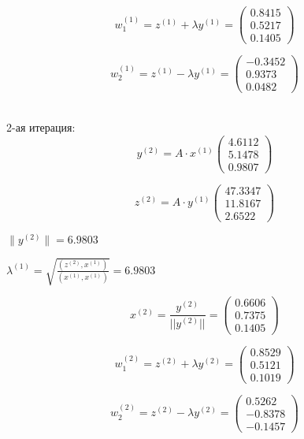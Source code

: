 \documentclass{article}
\begin{document}
	\[w^{(1)}_1 =z^{(1)} +  \lambda y^{(1)}=							
	\left(
	\begin{array}{ccc}
		0.8415 \\
		0.5217 \\
		0.1405
	\end{array}
	\right) \]
	
	\[w^{(1)}_2 =z^{(1)} - \lambda y^{(1)}=							
	\left(
	\begin{array}{ccc}
		-0.3452 \\
		0.9373 \\
		0.0482 
	\end{array}
	\right) \]
	
	
	~\\
	2-ая итерация:
	\[y^{(2)} = A \cdot x^{(1)}							
\left(
\begin{array}{ccc}
	4.6112 \\
	5.1478 \\
	0.9807
\end{array}
\right) \] 

\[z^{(2)} = A \cdot y^{(1)}							
\left(
\begin{array}{ccc}
	47.3347 \\
	11.8167 \\
	2.6522
\end{array}
\right) \] 

$\|y^{(2)}\| = 6.9803$


$\lambda^{(1)} = \sqrt{\frac{(z^{(2)}, x^{(1)})}	{(x^{(1)}, x^{(1)})}} =  6.9803$


\[x^{(2)} = \frac{y^{(2)}}{||y^{(2)}||}= 							
\left(
\begin{array}{ccc}
	0.6606  \\
	0.7375  \\
	0.1405
\end{array}
\right) \] 

\[w^{(2)}_1 =z^{(2)} +  \lambda y^{(2)}=							
\left(
\begin{array}{ccc}
	0.8529 \\
	0.5121 \\
	0.1019
\end{array}
\right) \]

\[w^{(2)}_2 =z^{(2)} - \lambda y^{(2)}=							
\left(
\begin{array}{ccc}
	0.5262 \\
	-0.8378 \\
	-0.1457 
\end{array}
\right) \]
	~\\
	
\end{document}
